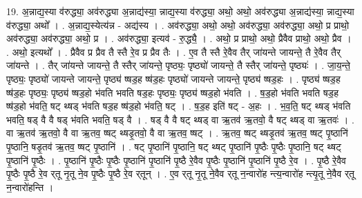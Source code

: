 \documentclass[17pt]{extarticle}
\begin{document}
19. अ॒न्नाद्य॒स्या व॑रुद्ध्या॒ अव॑रुद्ध्या अ॒न्नाद्य॑स्या॒ न्नाद्य॒स्या व॑रुद्ध्या॒ अथो॒ अथो॒ अव॑रुद्ध्या अ॒न्नाद्य॑स्या॒ न्नाद्य॒स्या व॑रुद्ध्या॒ अथो᳚ । . अ॒न्नाद्य॒स्येत्य॑न्न - अद्य॑स्य । . अव॑रुद्ध्या॒ अथो॒ अथो॒ अव॑रुद्ध्या॒ अव॑रुद्ध्या॒ अथो॒ प्र प्राथो॒ अव॑रुद्ध्या॒ अव॑रुद्ध्या॒ अथो॒ प्र । . अव॑रुद्ध्या॒ इत्यव॑ - रु॒द्ध्यै॒ । . अथो॒ प्र प्राथो॒ अथो॒ प्रैवैव प्राथो॒ अथो॒ प्रैव । . अथो॒ इत्यथो᳚ । . प्रैवैव प्र प्रैव तै स्तै रे॒व प्र प्रैव तैः । . ए॒व तै स्तै रे॒वैव तैर् जा॑यन्ते जायन्ते॒ तै रे॒वैव तैर् जा॑यन्ते । . तैर् जा॑यन्ते जायन्ते॒ तै स्तैर् जा॑यन्ते॒ पृष्ठ्यः॒ पृष्ठ्यो॑ जायन्ते॒ तै स्तैर् जा॑यन्ते॒ पृष्ठ्यः॑ । . जा॒य॒न्ते॒ पृष्ठ्यः॒ पृष्ठ्यो॑ जायन्ते जायन्ते॒ पृष्ठ्य॑ ष्षड॒ह ष्ष॑ड॒हः पृष्ठ्यो॑ जायन्ते जायन्ते॒ पृष्ठ्य॑ ष्षड॒हः । . पृष्ठ्य॑ ष्षड॒ह ष्ष॑ड॒हः पृष्ठ्यः॒ पृष्ठ्य॑ ष्षड॒हो भ॑वति भवति षड॒हः पृष्ठ्यः॒ पृष्ठ्य॑ ष्षड॒हो भ॑वति । . ष॒ड॒हो भ॑वति भवति षड॒ह ष्ष॑ड॒हो भ॑वति॒ षट् थ्षड् भ॑वति षड॒ह ष्ष॑ड॒हो भ॑वति॒ षट् । . ष॒ड॒ह इति॑ षट् - अ॒हः । . भ॒व॒ति॒ षट् थ्षड् भ॑वति भवति॒ षड् वै वै षड् भ॑वति भवति॒ षड् वै । . षड् वै वै षट् थ्षड् वा ऋ॒तव॑ ऋ॒तवो॒ वै षट् थ्षड् वा ऋ॒तवः॑ । . वा ऋ॒तव॑ ऋ॒तवो॒ वै वा ऋ॒तव॒ ष्षट् थ्षडृ॒तवो॒ वै वा ऋ॒तव॒ ष्षट् । . ऋ॒तव॒ ष्षट् थ्षडृ॒तव॑ ऋ॒तव॒ ष्षट् पृ॒ष्ठानि॑ पृ॒ष्ठानि॒ षडृ॒तव॑ ऋ॒तव॒ ष्षट् पृ॒ष्ठानि॑ । . षट् पृ॒ष्ठानि॑ पृ॒ष्ठानि॒ षट् थ्षट् पृ॒ष्ठानि॑ पृ॒ष्ठैः पृ॒ष्ठैः पृ॒ष्ठानि॒ षट् थ्षट् पृ॒ष्ठानि॑ पृ॒ष्ठैः । . पृ॒ष्ठानि॑ पृ॒ष्ठैः पृ॒ष्ठैः पृ॒ष्ठानि॑ पृ॒ष्ठानि॑ पृ॒ष्ठै रे॒वैव पृ॒ष्ठैः पृ॒ष्ठानि॑ पृ॒ष्ठानि॑ पृ॒ष्ठै रे॒व । . पृ॒ष्ठै रे॒वैव पृ॒ष्ठैः पृ॒ष्ठै रे॒व र्‌तू नृ॒तू ने॒व पृ॒ष्ठैः पृ॒ष्ठै रे॒व र्‌तून् । . ए॒व र्‌तू नृ॒तू ने॒वैव र्‌तू न॒न्वारो॑ह न्त्य॒न्वारो॑ह न्त्यृ॒तू ने॒वैव र्‌तू न॒न्वारो॑हन्ति । \newline
\end{document}
